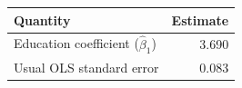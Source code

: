 \begin{center}
\begin{tabular}{lr}
\hline
Quantity & Estimate \\
\hline
Education coefficient ($\hat{\beta}_1$) & 3.690 \\
Usual OLS standard error & 0.083 \\
\hline
\end{tabular}
\end{center}
